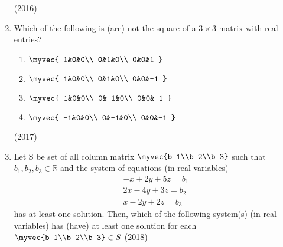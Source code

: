 \begin{enumerate}
\begin{enumerate}
        \end{enumerate}
        \hfill (2016)
    \item 
        Which of the following is (are) not the square of a $3 \times 3$ matrix with real entries?
\begin{multicols}{2}
            \begin{enumerate}
                \itemsep0.4em
                \item 
                    $\myvec{
                        1&0&0\\
                        0&1&0\\
                        0&0&1
                    }$\\
                \item 
                    $\myvec{
                        1&0&0\\
                        0&1&0\\
                        0&0&-1
                    }$\\
                \item 
                    $\myvec{
                        1&0&0\\
                        0&-1&0\\
                        0&0&-1
                    }$\\
                \item 
                    $\myvec{
                        -1&0&0\\
                        0&-1&0\\
                        0&0&-1
                    }$\\
            \end{enumerate}
\end{multicols}
            \hfill (2017)	
\item Let S be set of all column matrix $\myvec{b_1\\b_2\\b_3}$ such that $b_1, b_2, b_3 \in \mathbb{R}$ and the system of equations (in real variables)\begin{align*}-x+2y+5z=b_1\\2x-4y+3z=b_2\\x-2y+2z=b_3\end{align*} has at least one solution. Then, which of the following system(s) (in real variables) has (have) at least one solution for each $\myvec{b_1\\b_2\\b_3}\in S$ \hfill(2018)

\end{enumerate}

